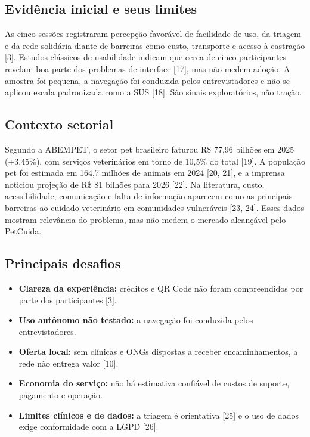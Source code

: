 \subsection{Evidência inicial e seus limites}

As cinco sessões registraram percepção favorável de facilidade de uso, da triagem e da rede solidária diante de barreiras como custo, transporte e acesso à castração [3]. Estudos clássicos de usabilidade indicam que cerca de cinco participantes revelam boa parte dos problemas de interface [17], mas não medem adoção. A amostra foi pequena, a navegação foi conduzida pelos entrevistadores e não se aplicou escala padronizada como a SUS [18]. São sinais exploratórios, não tração.

\subsection{Contexto setorial}

Segundo a ABEMPET, o setor pet brasileiro faturou R\$ 77,96 bilhões em 2025 (+3,45\%), com serviços veterinários em torno de 10,5\% do total [19]. A população pet foi estimada em 164,7 milhões de animais em 2024 [20, 21], e a imprensa noticiou projeção de R\$ 81 bilhões para 2026 [22]. Na literatura, custo, acessibilidade, comunicação e falta de informação aparecem como as principais barreiras ao cuidado veterinário em comunidades vulneráveis [23, 24]. Esses dados mostram relevância do problema, mas não medem o mercado alcançável pelo PetCuida.

\subsection{Principais desafios}

\begin{itemize}
\item \textbf{Clareza da experiência:} créditos e QR Code não foram compreendidos por parte dos participantes [3].
\item \textbf{Uso autônomo não testado:} a navegação foi conduzida pelos entrevistadores.
\item \textbf{Oferta local:} sem clínicas e ONGs dispostas a receber encaminhamentos, a rede não entrega valor [10].
\item \textbf{Economia do serviço:} não há estimativa confiável de custos de suporte, pagamento e operação.
\item \textbf{Limites clínicos e de dados:} a triagem é orientativa [25] e o uso de dados exige conformidade com a LGPD [26].
\end{itemize}

